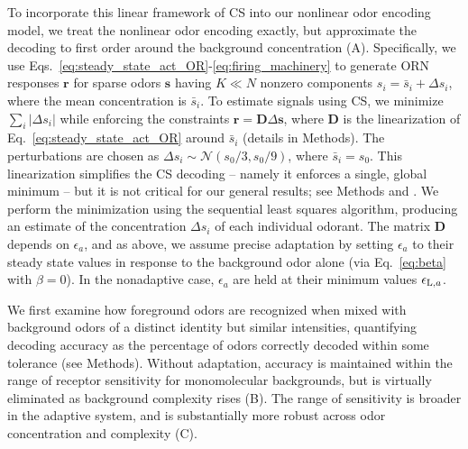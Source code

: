 \documentclass[9pt,lineno]{elife}
\begin{document}
To incorporate this linear framework of CS into our nonlinear odor encoding model, we treat the nonlinear odor encoding exactly, but approximate the decoding to first order around the background concentration (A). Specifically, we use Eqs.~\ref{eq:steady_state_act_OR}-\ref{eq:firing_machinery} to generate ORN responses $\mathbf r$ for sparse odors $\mathbf s$ having $K \ll N$ nonzero components $s_i = \bar{s}_i + \Delta s_i$, where the mean concentration is $\bar{s}_i$. To estimate  signals using CS, we minimize $\sum_i |\Delta s_i|$ while enforcing the constraints $\mathbf r = \mathbf D \Delta \mathbf s$, where $\mathbf D$ is the linearization of Eq.~\ref{eq:steady_state_act_OR} around $\bar{s}_i$ (details in Methods). The perturbations are chosen as $\Delta s_i \sim \mathcal {N} (s_0/3, s_0/9)$, where $\bar{s}_i = s_0$. This linearization simplifies the CS decoding -- namely it enforces a single, global minimum  -- but it is not critical for our general results; see Methods and . We perform the minimization 
using the sequential least squares algorithm, producing an estimate of the concentration $\Delta s_i$ of each individual odorant. The matrix $\mathbf D$ depends on $\epsilon_a$, and as above, we assume precise adaptation by setting $\epsilon_a$ to their steady state values in response to the background odor alone (via Eq.~\ref{eq:beta} with $\beta=0$). In the nonadaptive case, $\epsilon_a$ are held at their minimum values $\epsilon_{\textup L, a}$.


We first examine how foreground odors are recognized when mixed with background odors of a distinct identity but similar intensities, quantifying decoding accuracy as the percentage of odors correctly decoded within some tolerance (see Methods). Without adaptation, accuracy is maintained within the range of receptor sensitivity for monomolecular backgrounds, but is virtually eliminated as background complexity rises (B). The range of sensitivity is broader in the adaptive system, and is substantially more robust across odor concentration and complexity (C). 
\end{document}
